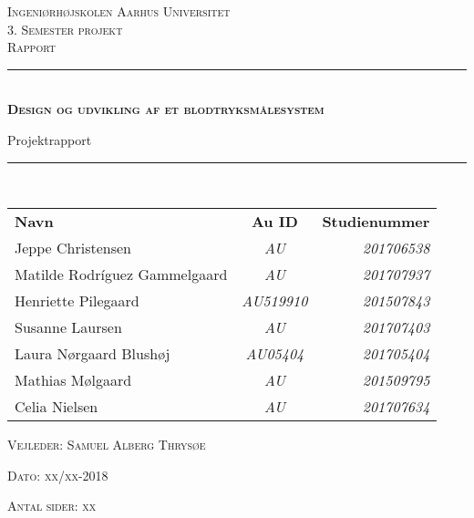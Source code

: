 \thispagestyle{empty}
\newcommand{\HRule}{\rule{\linewidth}{0.1mm}} %

\begin{center}
	\vspace{3cm}
	\textsc{\LARGE Ingeniørhøjskolen Aarhus Universitet}\\[1.5cm] %
	
	\textsc{\large 3. Semester projekt \\Rapport}\\[2.5cm] 
	
	\HRule \\[0.8cm]
	{\huge \bfseries \textsc{Design og udvikling af et
			blodtryksmålesystem}} 

	{\LARGE Projektrapport} \\[0.4cm]
	\HRule \\[1.5cm]
	

	
	
	\vspace{0.5 in}
	\begin{center}
		\begin{tabular}{l c r}
			\textbf{Navn} & \textbf{Au ID} & \textbf{Studienummer} \\
			Jeppe Christensen & \textsl{AU} & \textsl{201706538}  \\
			Matilde Rodríguez Gammelgaard & \textsl{AU} & \textsl{201707937}  \\
			Henriette Pilegaard & \textsl{AU519910} & \textsl{201507843}  \\
			Susanne Laursen & \textsl{AU} & \textsl{201707403}    \\
			Laura Nørgaard Blushøj & \textsl{AU05404} & \textsl{201705404}    \\
			Mathias Mølgaard & \textsl{AU} & \textsl{201509795}    \\
			Celia Nielsen & \textsl{AU} & \textsl{201707634}    \\
			
			
		\end{tabular}
	\end{center}
	\vspace{0.5 in}
	
	\textsc{\large Vejleder: Samuel Alberg Thrysøe}
	\vspace{0.5 in}
	
	\textsc{\large Dato: xx/xx-2018}\\
	\vspace{0.5 in}
	

\textsc{Antal sider: xx} \\
\vfill %
	
\end{center} %

\clearpage

\newpage